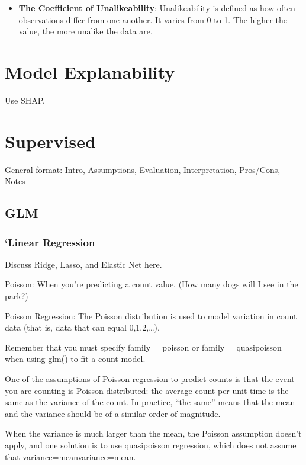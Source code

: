 \documentclass[]{book}
\providecommand{\tightlist}{%
  \setlength{\itemsep}{0pt}\setlength{\parskip}{0pt}}
\begin{document}
\begin{itemize}
\tightlist
\item
  \textbf{The Coefficient of Unalikeability}: Unalikeability is defined
  as how often observations differ from one another. It varies from 0 to
  1. The higher the value, the more unalike the data are.
\end{itemize}

\section{Model Explanability}\label{model-explanability}

Use SHAP.

\section{Supervised}\label{supervised}

General format: Intro, Assumptions, Evaluation, Interpretation,
Pros/Cons, Notes

\subsection{GLM}\label{glm}

\subsubsection{`Linear Regression}\label{linear-regression}

Discuss Ridge, Lasso, and Elastic Net here.

Poisson: When you're predicting a count value. (How many dogs will I see
in the park?)

Poisson Regression: The Poisson distribution is used to model variation
in count data (that is, data that can equal 0,1,2,\ldots{}).

Remember that you must specify family = poisson or family = quasipoisson
when using glm() to fit a count model.

One of the assumptions of Poisson regression to predict counts is that
the event you are counting is Poisson distributed: the average count per
unit time is the same as the variance of the count. In practice, ``the
same'' means that the mean and the variance should be of a similar order
of magnitude.

When the variance is much larger than the mean, the Poisson assumption
doesn't apply, and one solution is to use quasipoisson regression, which
does not assume that variance=meanvariance=mean.
\end{document}
